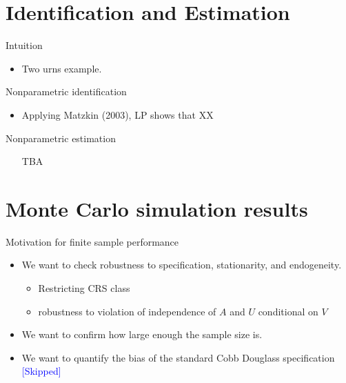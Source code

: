 \documentclass[aspectratio=169]{beamer}
\begin{document}
\section{Identification and Estimation}

\begin{frame}{Intuition}
    \begin{itemize}
    \item Two urns example.
    \end{itemize}
\end{frame}

\begin{frame}{Nonparametric identification}
    \begin{itemize}
    \item Applying Matzkin (2003), LP shows that XX
    \end{itemize}
\end{frame}

\begin{frame}{Nonparametric estimation}
    \begin{itemize}
    \item [TBA]
    \end{itemize}
\end{frame}



\section{Monte Carlo simulation results}

\begin{frame}{Motivation for finite sample performance}
\begin{itemize}
    \item We want to check robustness to specification, stationarity, and endogeneity.
    \begin{itemize}
        \item Restricting CRS class
        \item robustness to violation of independence of $A$ and $U$ conditional on $V$
    \end{itemize}
    \item We want to confirm how large enough the sample size is.
    \item We want to quantify the bias of the standard Cobb Douglass specification \textcolor{blue}{[Skipped]}
\end{itemize}
    
\end{frame}
\end{document}
